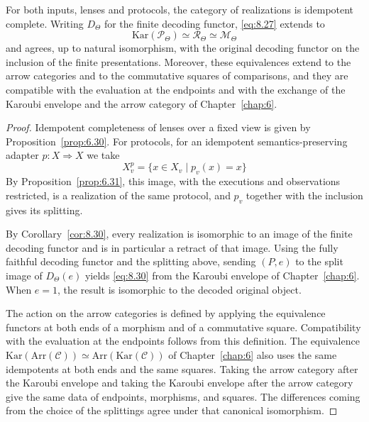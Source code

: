 \begin{proposition}\label{prop:8.31}

For both inputs, lenses and protocols, the category of realizations is idempotent complete.
Writing $D_\Theta$ for the finite decoding functor, \eqref{eq:8.27} extends to
\begin{equation*}
\mathrm{Kar}(\mathcal{P}_\Theta)
\simeq
\mathcal{R}_\Theta
\simeq
\mathcal{M}_\Theta
\tag{8.30}\label{eq:8.30}
\end{equation*}
and agrees, up to natural isomorphism, with the original decoding functor on the inclusion of
the finite presentations.
Moreover, these equivalences extend to the arrow categories and to the commutative squares of
comparisons, and they are compatible with the evaluation at the endpoints and with the
exchange of the Karoubi envelope and the arrow category of Chapter~\ref{chap:6}.

\end{proposition}

\begin{proof}

Idempotent completeness of lenses over a fixed view is given by Proposition~\ref{prop:6.30}.
For protocols, for an idempotent semantics-preserving adapter $p:X\Rightarrow X$ we take
\begin{equation*}
X_v^p=\{x\in X_v\mid p_v(x)=x\}
\tag{8.31}\label{eq:8.31}
\end{equation*}
By Proposition~\ref{prop:6.31}, this image, with the executions and observations restricted,
is a realization of the same protocol, and $p_v$ together with the inclusion gives its
splitting.

By Corollary~\ref{cor:8.30}, every realization is isomorphic to an image of the finite decoding
functor and is in particular a retract of that image.
Using the fully faithful decoding functor and the splitting above, sending $(P,e)$ to the split
image of $D_\Theta(e)$ yields \eqref{eq:8.30} from the Karoubi envelope of
Chapter~\ref{chap:6}.
When $e=1$, the result is isomorphic to the decoded original object.

The action on the arrow categories is defined by applying the equivalence functors at both ends
of a morphism and of a commutative square.
Compatibility with the evaluation at the endpoints follows from this definition.
The equivalence
$\mathrm{Kar}(\mathrm{Arr}(\mathcal{C}))\simeq\mathrm{Arr}(\mathrm{Kar}(\mathcal{C}))$ of
Chapter~\ref{chap:6} also uses the same idempotents at both ends and the same squares.
Taking the arrow category after the Karoubi envelope and taking the Karoubi envelope after
the arrow category give the same data of endpoints, morphisms, and squares.
The differences coming from the choice of the splittings agree under that canonical
isomorphism.

\end{proof}

